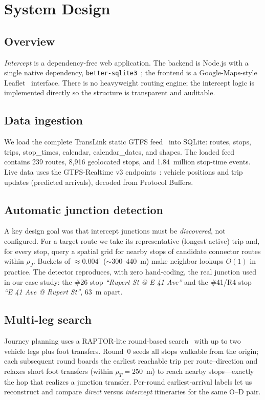 \documentclass[conference]{IEEEtran}
\begin{document}
\section{System Design}
\label{sec:system}
\subsection{Overview}
\emph{Intercept} is a dependency-free web application. The backend is Node.js
with a single native dependency, \texttt{better-sqlite3}~\cite{bettersqlite};
the frontend is a Google-Maps-style Leaflet~\cite{leaflet} interface. There is no
heavyweight routing engine; the intercept logic is implemented directly so the
structure is transparent and auditable.

\subsection{Data ingestion}
We load the complete TransLink static GTFS feed~\cite{translink,gtfs} into SQLite:
routes, stops, trips, stop\_times, calendar, calendar\_dates, and shapes. The
loaded feed contains 239 routes, 8{,}916 geolocated stops, and 1.84~million
stop-time events. Live data uses the GTFS-Realtime v3
endpoints~\cite{gtfsrt}: vehicle positions and trip updates (predicted arrivals),
decoded from Protocol Buffers.

\subsection{Automatic junction detection}
A key design goal was that intercept junctions must be \emph{discovered}, not
configured. For a target route we take its representative (longest active) trip
and, for every stop, query a spatial grid for nearby stops of candidate
connector routes within $\rho_J$. Buckets of $\approx 0.004^{\circ}$
($\sim$300--440~m) make neighbor lookups $O(1)$ in practice. The detector
reproduces, with zero hand-coding, the real junction used in our case study:
the \#26 stop \emph{``Rupert St @ E 41 Ave''} and the \#41/R4 stop
\emph{``E 41 Ave @ Rupert St''}, 63~m apart.

\subsection{Multi-leg search}
Journey planning uses a RAPTOR-lite round-based search~\cite{raptor} with up to
two vehicle legs plus foot transfers. Round~0 seeds all stops walkable from the
origin; each subsequent round boards the earliest reachable trip per
route--direction and relaxes short foot transfers (within $\rho_T=250$~m) to reach
nearby stops---exactly the hop that realizes a junction transfer. Per-round
earliest-arrival labels let us reconstruct and compare \emph{direct} versus
\emph{intercept} itineraries for the same O--D pair.
\end{document}
